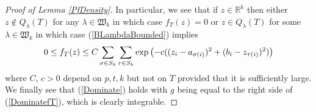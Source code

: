 \begin{proof}[Proof of Lemma \ref{PfDensity}]
In particular, we see that if $z\in\mathbb{R}^{k}$ then either $z\not\in Q_{\lambda}(T)$ for any $\lambda\in\mathfrak{W}_{k}$ in which case $f_{T}(z)=0$ or $z\in Q_{\lambda}(T)$ for some $\lambda\in\mathfrak{W}_k$ in which case (\ref{BLambdaBounded}) implies
\begin{equation}{\label{DominatefT}}
	\begin{split}
		0\leq f_T(z)\leq C\sum_{\sigma\in S_{k}}\sum_{\tau\in S_{k}}\exp\left(-c((z_i-a_{\sigma(i)})^2+(b_i-z_{\tau(i)})^2)\right)
	\end{split}
\end{equation}
where $C$, $c>0$ depend on $p,t,k$ but not on $T$ provided that it is sufficiently large. We finally see that (\ref{Dominate}) holds with $g$ being equal to the right side of (\ref{DominatefT}), which is clearly integrable.
\end{proof}


